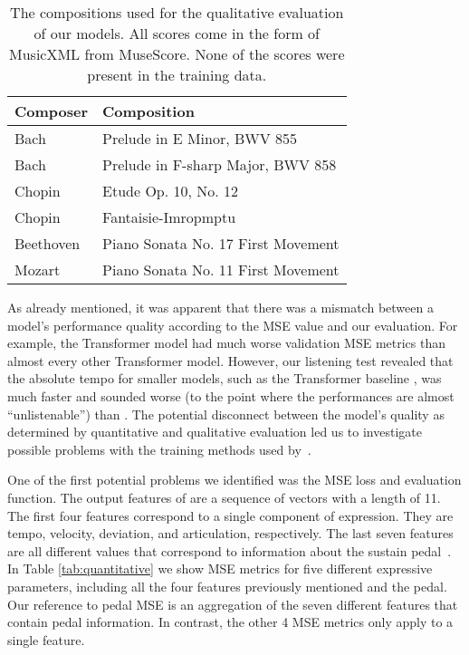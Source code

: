 \begin{table}
    \setlength{\extrarowheight}{3pt}
    \begin{center}
    \begin{tabular}[]{| l | l |}
        \hline
        Composer & Composition \\ 
        \hline 
        Bach & Prelude in E Minor, BWV 855 \\
        Bach & Prelude in F-sharp Major, BWV 858  \\ 
        Chopin & Etude Op. 10, No. 12 \\ 
        Chopin & Fantaisie-Imropmptu \\ 
        Beethoven & Piano Sonata No. 17 First Movement \\ 
        Mozart & Piano Sonata No. 11 First Movement \\ 
        \hline
    \end{tabular}
    \caption{The compositions used for the qualitative evaluation of our models. All scores come in the form of MusicXML from MuseScore. None of the scores were present in the training data.}
    \label{tab:compositions}
    \end{center}
\end{table}

As already mentioned, it was apparent that there was a mismatch between a model's performance quality according to the MSE value and our evaluation. For example, the Transformer model    had much worse validation MSE metrics than almost every other Transformer model. However, our listening test revealed that the absolute tempo for smaller models, such as the Transformer baseline , was much faster and sounded worse (to the point where the performances are almost ``unlistenable'') than . The potential disconnect between the model's quality as determined by quantitative and qualitative evaluation led us to investigate possible problems with the training methods used by~\citet{jeong2019virtuosonet}. 

One of the first potential problems we identified was the MSE loss and evaluation function. The output features of \vnet{} are a sequence of vectors with a length of 11. The first four features correspond to a single component of expression. They are tempo, velocity, deviation, and articulation, respectively. The last seven features are all different values that correspond to information about the sustain pedal~\cite{jeong2019score}. In Table \ref{tab:quantitative} we show MSE metrics for five different expressive parameters, including all the four features previously mentioned and the pedal. Our reference to pedal MSE is an aggregation of the seven different features that contain pedal information. In contrast, the other 4 MSE metrics only apply to a single feature.

